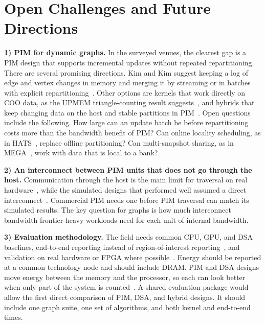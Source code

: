 \documentclass[journal,onecolumn]{IEEEtran}
\begin{document}
\section{Open Challenges and Future Directions}\label{sec:open}
\textbf{1) PIM for dynamic graphs.} In the surveyed venues, the clearest gap is a PIM design that supports incremental updates without repeated repartitioning. There are several promising directions. Kim and Kim suggest keeping a log of edge and vertex changes in memory and merging it by streaming or in batches with explicit repartitioning~\cite{kim2020dynamic}. Other options are kernels that work directly on COO data, as the UPMEM triangle-counting result suggests~\cite{asquini2025tc}, and hybrids that keep changing data on the host and stable partitions in PIM~\cite{shin2025fala}. Open questions include the following. How large can an update batch be before repartitioning costs more than the bandwidth benefit of PIM? Can online locality scheduling, as in HATS~\cite{mukkara2018hats}, replace offline partitioning? Can multi-snapshot sharing, as in MEGA~\cite{gao2023mega}, work with data that is local to a bank?

\textbf{2) An interconnect between PIM units that does not go through the host.} Communication through the host is the main limit for traversal on real hardware~\cite{gomezluna2022prim,barkhordar2025alphapim}, while the simulated designs that performed well assumed a direct interconnect~\cite{ahn2015tesseract,zhuo2019graphq}. Commercial PIM needs one before PIM traversal can match its simulated results. The key question for graphs is how much interconnect bandwidth frontier-heavy workloads need for each unit of internal bandwidth.

\textbf{3) Evaluation methodology.} The field needs common CPU, GPU, and DSA baselines, end-to-end reporting instead of region-of-interest reporting~\cite{yenimol2026cograf}, and validation on real hardware or FPGA where possible~\cite{shin2025piccolo,chen2022regraph}. Energy should be reported at a common technology node and should include DRAM. PIM and DSA designs move energy between the memory and the processor, so each can look better when only part of the system is counted~\cite{yenimol2026cograf,ham2016graphicionado}. A shared evaluation package would allow the first direct comparison of PIM, DSA, and hybrid designs. It should include one graph suite, one set of algorithms, and both kernel and end-to-end times.
\end{document}
